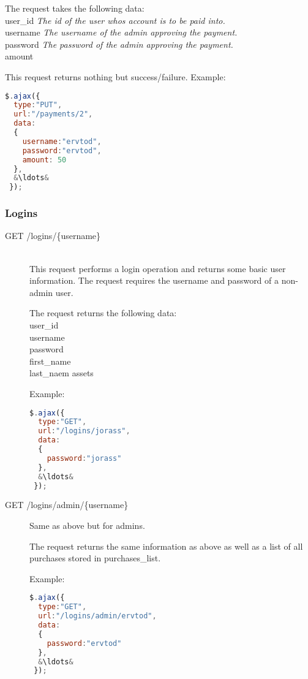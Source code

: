\documentclass[a4paper]{article}
\begin{document}
\begin{description}
    The request takes the following data:\hfill\\
    user\_id \textit{The id of the user whos account is to be paid into.}\hfill\\
    username \textit{The username of the admin approving the payment.}\hfill\\
    password \textit{The password of the admin approving the payment.}\hfill\\
    amount

    This request returns nothing but success/failure.
  Example:\hfill\\
  \begin{lstlisting}[language=javascript, frame=single, showstringspaces = false, basicstyle=\small\ttfamily, escapechar=\&]
$.ajax({
  type:"PUT",
  url:"/payments/2",
  data:
  {
    username:"ervtod",
    password:"ervtod",
    amount: 50
  },
  &\ldots&
 });
  \end{lstlisting}   
\end{description}
\subsubsection{Logins}
\begin{description}
  \item[GET /logins/\{username\}]\hfill\\
    This request performs a login operation and returns some basic user information. The request requires the username and password of a non-admin user.

    The request returns the following data:\hfill\\
    user\_id\hfill\\
    username\hfill\\
    password\hfill\\
    first\_name\hfill\\
    last\_naem
    assets

  Example:\hfill\\
  \begin{lstlisting}[language=javascript, frame=single, showstringspaces = false, basicstyle=\small\ttfamily, escapechar=\&]
$.ajax({
  type:"GET",
  url:"/logins/jorass",
  data:
  {
    password:"jorass"
  },
  &\ldots&
 });
  \end{lstlisting}

  \item[GET /logins/admin/\{username\}]
    Same as above but for admins.

    The request returns the same information as above as well as a list of all purchases stored in purchases\_list.

  Example:\hfill\\
  \begin{lstlisting}[language=javascript, frame=single, showstringspaces = false, basicstyle=\small\ttfamily, escapechar=\&]
$.ajax({
  type:"GET",
  url:"/logins/admin/ervtod",
  data:
  {
    password:"ervtod"
  },
  &\ldots&
 });
  \end{lstlisting}    
\end{description}
\end{document}
